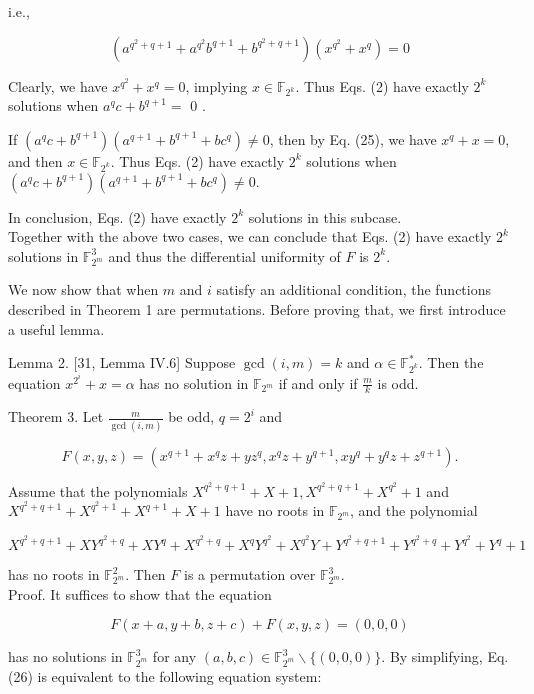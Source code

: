 \documentclass[10pt]{article}
\begin{document}
i.e.,

$$
\left(a^{q^{2}+q+1}+a^{q^{2}} b^{q+1}+b^{q^{2}+q+1}\right)\left(x^{q^{2}}+x^{q}\right)=0
$$

Clearly, we have $x^{q^{2}}+x^{q}=0$, implying $x \in \mathbb{F}_{2^{k}}$. Thus Eqs. (2) have exactly $2^{k}$ solutions when $a^{q} c+b^{q+1}=$ 0 .

If $\left(a^{q} c+b^{q+1}\right)\left(a^{q+1}+b^{q+1}+b c^{q}\right) \neq 0$, then by Eq. (25), we have $x^{q}+x=0$, and then $x \in \mathbb{F}_{2^{k}}$. Thus Eqs. (2) have exactly $2^{k}$ solutions when $\left(a^{q} c+b^{q+1}\right)\left(a^{q+1}+b^{q+1}+b c^{q}\right) \neq 0$.

In conclusion, Eqs. (2) have exactly $2^{k}$ solutions in this subcase.\\
Together with the above two cases, we can conclude that Eqs. (2) have exactly $2^{k}$ solutions in $\mathbb{F}_{2^{m}}^{3}$ and thus the differential uniformity of $F$ is $2^{k}$.

We now show that when $m$ and $i$ satisfy an additional condition, the functions described in Theorem 1 are permutations. Before proving that, we first introduce a useful lemma.

Lemma 2. [31, Lemma IV.6] Suppose $\operatorname{gcd}(i, m)=k$ and $\alpha \in \mathbb{F}_{2^{k}}^{*}$. Then the equation $x^{2^{i}}+x=\alpha$ has no solution in $\mathbb{F}_{2^{m}}$ if and only if $\frac{m}{k}$ is odd.

Theorem 3. Let $\frac{m}{\operatorname{gcd}(i, m)}$ be odd, $q=2^{i}$ and

$$
F(x, y, z)=\left(x^{q+1}+x^{q} z+y z^{q}, x^{q} z+y^{q+1}, x y^{q}+y^{q} z+z^{q+1}\right) .
$$

Assume that the polynomials $X^{q^{2}+q+1}+X+1, X^{q^{2}+q+1}+X^{q^{2}}+1$ and $X^{q^{2}+q+1}+X^{q^{2}+1}+X^{q+1}+X+1$ have no roots in $\mathbb{F}_{2^{m}}$, and the polynomial

$$
X^{q^{2}+q+1}+X Y^{q^{2}+q}+X Y^{q}+X^{q^{2}+q}+X^{q} Y^{q^{2}}+X^{q^{2}} Y+Y^{q^{2}+q+1}+Y^{q^{2}+q}+Y^{q^{2}}+Y^{q}+1
$$

has no roots in $\mathbb{F}_{2^{m}}^{2}$. Then $F$ is a permutation over $\mathbb{F}_{2^{m}}^{3}$.\\
Proof. It suffices to show that the equation


\begin{equation*}
F(x+a, y+b, z+c)+F(x, y, z)=(0,0,0) \tag{26}
\end{equation*}


has no solutions in $\mathbb{F}_{2^{m}}^{3}$ for any $(a, b, c) \in \mathbb{F}_{2^{m}}^{3} \backslash\{(0,0,0)\}$. By simplifying, Eq. (26) is equivalent to the following equation system:
\end{document}
